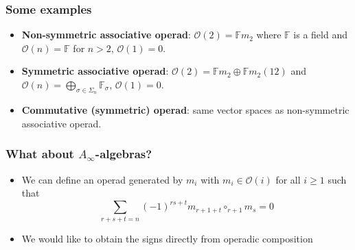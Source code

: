 \documentclass{beamer}
\theoremstyle{definition}
\begin{document}
\begin{frame}
\frametitle{Some examples}

\begin{itemize}
\item<1-> \textbf{Non-symmetric associative operad}: $\mathcal{O}(2)=\mathbb{F} m_2$ where $\mathbb{F}$ is a field and $\mathcal{O}(n)=\mathbb{F}$ for $n> 2$, $\mathcal{O}(1)=0$. 
\item<2-> \textbf{Symmetric associative operad}: $\mathcal{O}(2)=\mathbb{F}m_2\oplus\mathbb{F}m_2(12)$ and $\mathcal{O}(n)=\bigoplus_{\sigma\in\Sigma_n}\mathbb{F}_\sigma$, $\mathcal{O}(1)=0$. 
\item<3-> \textbf{Commutative (symmetric) operad}: same vector spaces as non-symmetric associative operad. %

\end{itemize}
\end{frame}


\begin{frame}
\frametitle{What about $A_\infty$-algebras?}
\begin{itemize}
\item<1-> We can define an operad generated by $m_i$ with $m_i\in\mathcal{O}(i)$ for all $i\geq 1$ such that 
$$\sum_{r+s+t=n}(-1)^{rs+t}m_{r+1+t}\circ_{r+1}m_s=0$$ 

\item<2-> We would like to obtain the signs directly from operadic composition
\end{itemize}
\end{frame}
\end{document}
